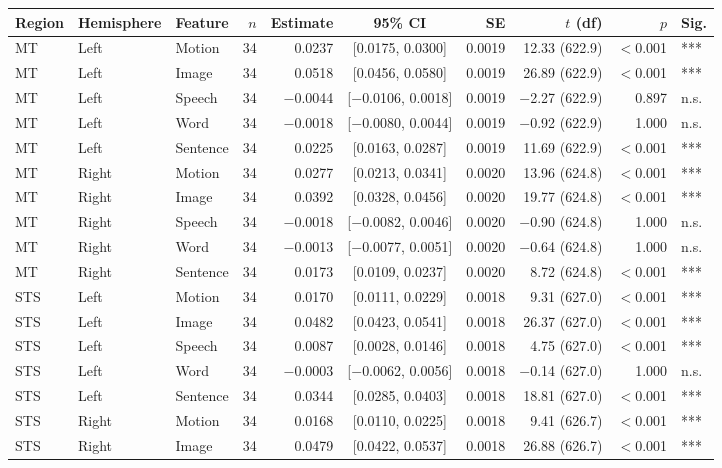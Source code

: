 \begin{table}[h]
\centering
\begin{tabular}{lllrrcrrrl}
\toprule
Region & Hemisphere & Feature & $n$ & Estimate & 95\% CI & SE & $t$ (df) & $p$ & Sig. \\
\midrule
MT & Left & Motion & 34 & 0.0237 & [0.0175, 0.0300] & 0.0019 & 12.33 (622.9) & $<$0.001 & *** \\
MT & Left & Image & 34 & 0.0518 & [0.0456, 0.0580] & 0.0019 & 26.89 (622.9) & $<$0.001 & *** \\
MT & Left & Speech & 34 & $-$0.0044 & [$-$0.0106, 0.0018] & 0.0019 & $-$2.27 (622.9) & 0.897 & n.s. \\
MT & Left & Word & 34 & $-$0.0018 & [$-$0.0080, 0.0044] & 0.0019 & $-$0.92 (622.9) & 1.000 & n.s. \\
MT & Left & Sentence & 34 & 0.0225 & [0.0163, 0.0287] & 0.0019 & 11.69 (622.9) & $<$0.001 & *** \\
MT & Right & Motion & 34 & 0.0277 & [0.0213, 0.0341] & 0.0020 & 13.96 (624.8) & $<$0.001 & *** \\
MT & Right & Image & 34 & 0.0392 & [0.0328, 0.0456] & 0.0020 & 19.77 (624.8) & $<$0.001 & *** \\
MT & Right & Speech & 34 & $-$0.0018 & [$-$0.0082, 0.0046] & 0.0020 & $-$0.90 (624.8) & 1.000 & n.s. \\
MT & Right & Word & 34 & $-$0.0013 & [$-$0.0077, 0.0051] & 0.0020 & $-$0.64 (624.8) & 1.000 & n.s. \\
MT & Right & Sentence & 34 & 0.0173 & [0.0109, 0.0237] & 0.0020 & 8.72 (624.8) & $<$0.001 & *** \\
STS & Left & Motion & 34 & 0.0170 & [0.0111, 0.0229] & 0.0018 & 9.31 (627.0) & $<$0.001 & *** \\
STS & Left & Image & 34 & 0.0482 & [0.0423, 0.0541] & 0.0018 & 26.37 (627.0) & $<$0.001 & *** \\
STS & Left & Speech & 34 & 0.0087 & [0.0028, 0.0146] & 0.0018 & 4.75 (627.0) & $<$0.001 & *** \\
STS & Left & Word & 34 & $-$0.0003 & [$-$0.0062, 0.0056] & 0.0018 & $-$0.14 (627.0) & 1.000 & n.s. \\
STS & Left & Sentence & 34 & 0.0344 & [0.0285, 0.0403] & 0.0018 & 18.81 (627.0) & $<$0.001 & *** \\
STS & Right & Motion & 34 & 0.0168 & [0.0110, 0.0225] & 0.0018 & 9.41 (626.7) & $<$0.001 & *** \\
STS & Right & Image & 34 & 0.0479 & [0.0422, 0.0537] & 0.0018 & 26.88 (626.7) & $<$0.001 & *** \\

\end{tabular}
\end{table}
